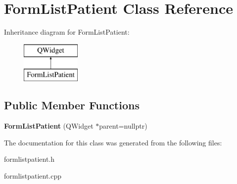 \hypertarget{class_form_list_patient}{}\section{Form\+List\+Patient Class Reference}
\label{class_form_list_patient}
Inheritance diagram for Form\+List\+Patient\+:\begin{figure}[H]
\begin{center}
\leavevmode
\includegraphics[height=2.000000cm]{class_form_list_patient}
\end{center}
\end{figure}
\subsection*{Public Member Functions}
\begin{DoxyCompactItemize}
\item 
\mbox{\label{class_form_list_patient_a8a49cd4ae53bb5ca0f1bcdf3dec286cf}} 
{\bfseries Form\+List\+Patient} (Q\+Widget $\ast$parent=nullptr)
\end{DoxyCompactItemize}


The documentation for this class was generated from the following files\+:\begin{DoxyCompactItemize}
\item 
formlistpatient.\+h\item 
formlistpatient.\+cpp\end{DoxyCompactItemize}
